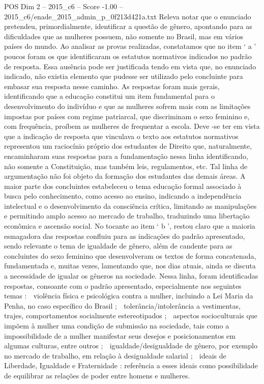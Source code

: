 \begin{textsample}{POS Dim 2 – 2015\_c6 – Score -1.00 – 2015\_c6/enade\_2015\_admin\_p\_0f213d421a.txt}
Releva notar que o enunciado pretendeu, primordialmente, identificar a questão de gênero, apontando para as dificuldades que as mulheres possuem, não somente no Brasil, mas em vários países do mundo.
Ao analisar as provas realizadas, constatamos que no item ‘ a ’ poucos foram os que identificaram os estatutos normativos indicados no padrão de resposta.
Essa ausência pode ser justificada tendo em vista que, no enunciado indicado, não existia elemento que pudesse ser utilizado pelo concluinte para embasar sua resposta nesse caminho.
As respostas foram mais gerais, identificando que a educação constitui um item fundamental para o desenvolvimento do indivíduo e que as mulheres sofrem mais com as limitações impostas por países com regime patriarcal, que discriminam o sexo feminino e, com frequência, proíbem as mulheres de frequentar a escola.
Deve -se ter em vista que a indicação de resposta que vinculava o texto aos estatutos normativos representou um raciocínio próprio dos estudantes de Direito que, naturalmente, encaminharam suas respostas para a fundamentação nessa linha identificando, não somente a Constituição, mas também leis, regulamentos, etc.
Tal linha de argumentação não foi objeto da formação dos estudantes das demais áreas.
A maior parte dos concluintes estabeleceu o tema educação formal associado à busca pelo conhecimento, como acesso ao ensino, indicando a independência intelectual e o desenvolvimento da consciência crítica, limitando as manipulações e permitindo amplo acesso ao mercado de trabalho, traduzindo uma libertação econômica e ascensão social.
No tocante ao item ‘ b ’, restou claro que a maioria esmagadora das respostas confluiu para as indicações do padrão apresentado, sendo relevante o tema de igualdade de gênero, além de candente para as concluintes do sexo feminino que desenvolveram os textos de forma concatenada, fundamentada e, muitas vezes, lamentando que, nos dias atuais, ainda se discuta a necessidade de igualar os gêneros na sociedade.
Nessa linha, foram identificadas respostas, consoante com o padrão apresentado, especialmente nos seguintes temas :  violência física e psicológica contra a mulher, incluindo a Lei Maria da Penha, no caso específico do Brasil ;  tolerância/intolerância a vestimentas, trajes, comportamentos socialmente estereotipados ;  aspectos socioculturais que impõem à mulher uma condição de submissão na sociedade, tais como a impossibilidade de a mulher manifestar seus desejos e posicionamentos em algumas culturas, entre outros ;  igualdade/desigualdade de gênero, por exemplo no mercado de trabalho, em relação à desigualdade salarial ;  ideais de Liberdade, Igualdade e Fraternidade : referência a esses ideais como possibilidade de equilibrar as relações de poder entre homens e mulheres.

\end{textsample}
